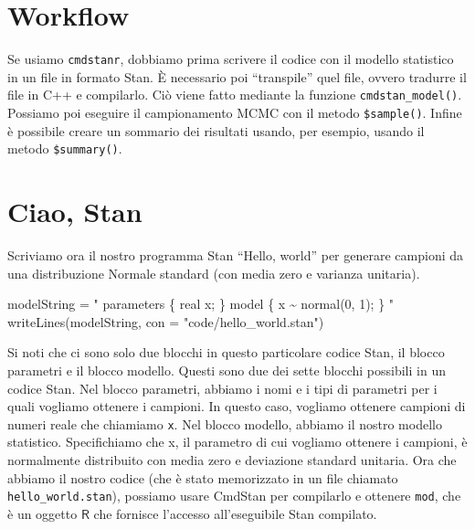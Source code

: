\documentclass[
  10pt,
  italian,
  a4paper,
  extrafontsizes,onecolumn,openright
  ]{memoir}
\newenvironment{Shaded}{\begin{snugshade}}{\end{snugshade}}
\newcommand{\AttributeTok}[1]{\textcolor[rgb]{0.77,0.63,0.00}{#1}}
\newcommand{\FunctionTok}[1]{\textcolor[rgb]{0.00,0.00,0.00}{#1}}
\newcommand{\NormalTok}[1]{#1}
\newcommand{\OtherTok}[1]{\textcolor[rgb]{0.56,0.35,0.01}{#1}}
\newcommand{\StringTok}[1]{\textcolor[rgb]{0.31,0.60,0.02}{#1}}
\newcommand{\R}{\textsf{R}} %
\begin{document}
\hypertarget{workflow}{%
\section{Workflow}\label{workflow}}

Se usiamo \texttt{cmdstanr}, dobbiamo prima scrivere il codice con il modello statistico in un file in formato Stan. È necessario poi ``transpile'' quel file, ovvero tradurre il file in C++ e compilarlo. Ciò viene fatto mediante la funzione \texttt{cmdstan\_model()}. Possiamo poi eseguire il campionamento MCMC con il metodo \texttt{\$sample()}. Infine è possibile creare un sommario dei risultati usando, per esempio, usando il metodo \texttt{\$summary()}.

\hypertarget{ciao-stan}{%
\section{Ciao, Stan}\label{ciao-stan}}

Scriviamo ora il nostro programma Stan ``Hello, world'' per generare campioni da una distribuzione Normale standard (con media zero e varianza unitaria).

\begin{Shaded}
\begin{Highlighting}[]
\NormalTok{modelString }\OtherTok{=} \StringTok{"}
\StringTok{parameters \{}
\StringTok{  real x;}
\StringTok{\}}
\StringTok{model \{}
\StringTok{  x \textasciitilde{} normal(0, 1);}
\StringTok{\}}
\StringTok{"}
\FunctionTok{writeLines}\NormalTok{(modelString, }\AttributeTok{con =} \StringTok{"code/hello\_world.stan"}\NormalTok{)}
\end{Highlighting}
\end{Shaded}

Si noti che ci sono solo due blocchi in questo particolare codice Stan, il blocco parametri e il blocco modello. Questi sono due dei sette blocchi possibili in un codice Stan. Nel blocco parametri, abbiamo i nomi e i tipi di parametri per i quali vogliamo ottenere i campioni. In questo caso, vogliamo ottenere campioni di numeri reale che chiamiamo \texttt{x}. Nel blocco modello, abbiamo il nostro modello statistico. Specifichiamo che x, il parametro di cui vogliamo ottenere i campioni, è normalmente distribuito con media zero e deviazione standard unitaria. Ora che abbiamo il nostro codice (che è stato memorizzato in un file chiamato \texttt{hello\_world.stan}), possiamo usare CmdStan per compilarlo e ottenere \texttt{mod}, che è un oggetto \(\R\) che fornisce l'accesso all'eseguibile Stan compilato.
\end{document}
